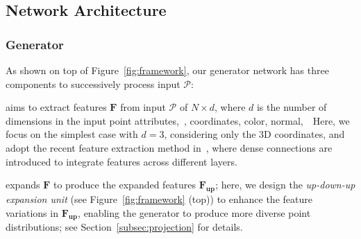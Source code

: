 
\subsection{Network Architecture}
\label{subsec:network}

\subsubsection{Generator}
As shown on top of Figure~\ref{fig:framework}, our generator network has three components to successively process input $\mathcal{P}$:

 aims to extract features $\mathbf{F}$ from input $\mathcal{P}$ of $N \times d$, where $d$ is the number of dimensions in the input point attributes,~\ie, coordinates, color, normal,~\etc\
Here, we focus on the simplest case with $d=3$, considering only the 3D coordinates, and adopt the recent feature extraction method in~\cite{yifan2018patch}, where dense connections are introduced to integrate features across different layers.
%

 expands $\mathbf{F}$ to produce the expanded features $\mathbf{F_{\text{up}}}$; here, we design the \emph{up-down-up expansion unit} (see Figure~\ref{fig:framework} (top)) to enhance the feature variations in  $\mathbf{F_{\text{up}}}$, enabling the generator to produce more diverse point distributions; see Section~\ref{subsec:projection} for details.

